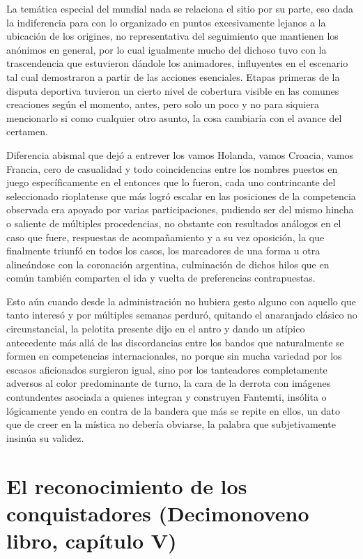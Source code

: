 \documentclass[
]{book}
\begin{document}
La temática especial del mundial nada se relaciona el sitio por su parte, eso dada la indiferencia para con lo organizado en puntos excesivamente lejanos a la ubicación de los origines, no representativa del seguimiento que mantienen los anónimos en general, por lo cual igualmente mucho del dichoso tuvo con la trascendencia que estuvieron dándole los animadores, influyentes en el escenario tal cual demostraron a partir de las acciones esenciales. Etapas primeras de la disputa deportiva tuvieron un cierto nivel de cobertura visible en las comunes creaciones según el momento, antes, pero solo un poco y no para siquiera mencionarlo si como cualquier otro asunto, la cosa cambiaría con el avance del certamen.

Diferencia abismal que dejó a entrever los vamos Holanda, vamos Croacia, vamos Francia, cero de casualidad y todo coincidencias entre los nombres puestos en juego específicamente en el entonces que lo fueron, cada uno contrincante del seleccionado rioplatense que más logró escalar en las posiciones de la competencia observada era apoyado por varias participaciones, pudiendo ser del mismo hincha o saliente de múltiples procedencias, no obstante con resultados análogos en el caso que fuere, respuestas de acompañamiento y a su vez oposición, la que finalmente triunfó en todos los casos, los marcadores de una forma u otra alineándose con la coronación argentina, culminación de dichos hilos que en común también comparten el ida y vuelta de preferencias contrapuestas.

Esto aún cuando desde la administración no hubiera gesto alguno con aquello que tanto interesó y por múltiples semanas perduró, quitando el anaranjado clásico no circunstancial, la pelotita presente dijo en el antro y dando un atípico antecedente más allá de las discordancias entre los bandos que naturalmente se formen en competencias internacionales, no porque sin mucha variedad por los escasos aficionados surgieron igual, sino por los tanteadores completamente adversos al color predominante de turno, la cara de la derrota con imágenes contundentes asociada a quienes integran y construyen Fantemti, insólita o lógicamente yendo en contra de la bandera que más se repite en ellos, un dato que de creer en la mística no debería obviarse, la palabra que subjetivamente insinúa su validez.

\hypertarget{el-reconocimiento-de-los-conquistadores-decimonoveno-libro-capuxedtulo-v}{%
\section{El reconocimiento de los conquistadores (Decimonoveno libro, capítulo V)}\label{el-reconocimiento-de-los-conquistadores-decimonoveno-libro-capuxedtulo-v}}
\end{document}
